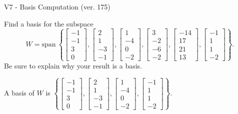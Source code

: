 \begin{exercise}
  \begin{exerciseTitle}V7 - Basis Computation (ver. 175)\end{exerciseTitle}
  \begin{exerciseStatement}
    Find a basis for the subspace 
\[W=\mathrm{span}\ \left\{\left[\begin{array}{r}
-1 \\
-1 \\
3 \\
0
\end{array}\right] , \left[\begin{array}{r}
2 \\
1 \\
-3 \\
-1
\end{array}\right] , \left[\begin{array}{r}
1 \\
-4 \\
0 \\
-2
\end{array}\right] , \left[\begin{array}{r}
3 \\
-2 \\
-6 \\
-2
\end{array}\right] , \left[\begin{array}{r}
-14 \\
17 \\
21 \\
13
\end{array}\right] , \left[\begin{array}{r}
-1 \\
1 \\
1 \\
-2
\end{array}\right]\right\}.\]
 Be sure to explain why your result is a basis.


  \end{exerciseStatement}
  \begin{exerciseAnswer}
   A basis of \(W\) is  \(\left\{\left[\begin{array}{r}
-1 \\
-1 \\
3 \\
0
\end{array}\right] , \left[\begin{array}{r}
2 \\
1 \\
-3 \\
-1
\end{array}\right] , \left[\begin{array}{r}
1 \\
-4 \\
0 \\
-2
\end{array}\right] , \left[\begin{array}{r}
-1 \\
1 \\
1 \\
-2
\end{array}\right]\right\}\).
  


  \end{exerciseAnswer}
\end{exercise}